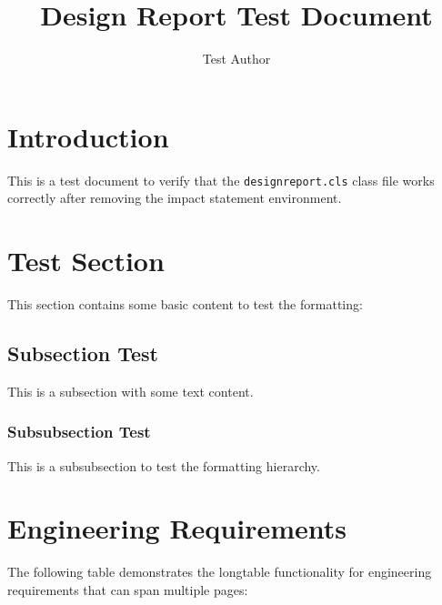 \documentclass{../designreport}
\title{Design Report Test Document}
\author{Test Author}
\begin{document}
\maketitle

\tableofcontents
\newpage

\section{Introduction}

This is a test document to verify that the \texttt{designreport.cls} class file works correctly after removing the impact statement environment.

\section{Test Section}

This section contains some basic content to test the formatting:

\subsection{Subsection Test}

This is a subsection with some text content.

\subsubsection{Subsubsection Test}

This is a subsubsection to test the formatting hierarchy.

\section{Engineering Requirements}

The following table demonstrates the longtable functionality for engineering requirements that can span multiple pages:
\end{document}
